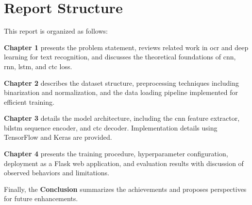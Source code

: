 \section*{Report Structure}

This report is organized as follows:

\textbf{Chapter 1} presents the problem statement, reviews related work in \gls{ocr}
and deep learning for text recognition, and discusses the theoretical foundations of
\gls{cnn}, \gls{rnn}, \gls{lstm}, and \gls{ctc} loss.

\textbf{Chapter 2} describes the dataset structure, preprocessing techniques including
binarization and normalization, and the data loading pipeline implemented for efficient
training.

\textbf{Chapter 3} details the model architecture, including the \gls{cnn} feature
extractor, \gls{bilstm} sequence encoder, and \gls{ctc} decoder. Implementation details
using TensorFlow and Keras are provided.

\textbf{Chapter 4} presents the training procedure, hyperparameter configuration,
deployment as a Flask web application, and evaluation results with discussion of
observed behaviors and limitations.

Finally, the \textbf{Conclusion} summarizes the achievements and proposes perspectives
for future enhancements.
